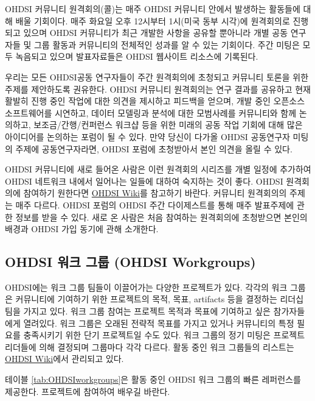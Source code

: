 \documentclass[11pt]{book}
\theoremstyle{definition}
\theoremstyle{definition}
\theoremstyle{definition}
\theoremstyle{remark}
\begin{document}
OHDSI 커뮤니티 원격회의(콜)는 매주 OHDSI 커뮤니티 안에서 발생하는
활동들에 대해 배울 기회이다. 매주 화요일 오후 12시부터 1시(미국 동부
시각)에 원격회의로 진행되고 있으며 OHDSI 커뮤니티가 최근 개발한 사항을
공유할 뿐아니라 개별 공동 연구자들 및 그룹 활동과 커뮤니티의 전체적인
성과를 알 수 있는 기회이다. 주간 미팅은 모두 녹음되고 있으며
발표자료들은 OHDSI 웹사이트 리소스에 기록된다.

우리는 모든 OHDSI공동 연구자들이 주간 원격회의에 초청되고 커뮤니티
토론을 위한 주제를 제안하도록 권유한다. OHDSI 커뮤니티 원격회의는 연구
결과를 공유하고 현재 활발히 진행 중인 작업에 대한 의견을 제시하고
피드백을 얻으며, 개발 중인 오픈소스 소프트웨어를 시연하고, 데이터
모델링과 분석에 대한 모범사례를 커뮤니티와 함께 논의하고,
보조금/간행/컨퍼런스 워크샵 등을 위한 미래의 공동 작업 기회에 대해 많은
아이디어를 논의하는 포럼이 될 수 있다. 만약 당신이 다가올 OHDSI
공동연구자 미팅의 주제에 공동연구자라면, OHDSI 포럼에 초청받아서 본인
의견을 올릴 수 있다.

OHDSI 커뮤니티에 새로 들어온 사람은 이런 원격회의 시리즈를 개별 일정에
추가하여 OHDSI 네트워크 내에서 일어나는 일들에 대하여 숙지하는 것이
좋다. OHDSI 원격회의에 참여하기 원한다면
\href{https://www.ohdsi.org/web/wiki/doku.php?id=projects:ohdsi_community}{OHDSI
Wiki}를 참고하기 바란다. 커뮤니티 원격회의의 주제는 매주 다르다. OHDSI
포럼의 OHDSI 주간 다이제스트를 통해 매주 발표주제에 관한 정보를 받을 수
있다. 새로 온 사람은 처음 참여하는 원격회의에 초청받으면 본인의 배경과
OHDSI 가입 동기에 관해 소개한다. 

\subsection{OHDSI 워크 그룹 (OHDSI
Workgroups)}\label{ohdsi---ohdsi-workgroups}

OHDSI에는 워크 그룹 팀들이 이끌어가는 다양한 프로젝트가 있다. 각각의
워크 그룹은 커뮤니티에 기여하기 위한 프로젝트의 목적, 목표, artifacts
등을 결정하는 리더십 팀을 가지고 있다. 워크 그룹 참여는 프로젝트 목적과
목표에 기여하고 싶은 참가자들에게 열려있다. 워크 그룹은 오래된 전략적
목표를 가지고 있거나 커뮤니티의 특정 필요를 충족시키기 위한 단기
프로젝트일 수도 있다. 워크 그룹의 정기 미팅은 프로젝트 리더들에 의해
결정되며 그룹마다 각각 다르다. 활동 중인 워크 그룹들의 리스트는
\href{https://www.ohdsi.org/web/wiki/doku.php?id=projects:overview}{OHDSI
Wiki}에서 관리되고 있다. 

테이블 \ref{tab:OHDSIworkgroups}은 활동 중인 OHDSI 워크 그룹의 빠른
레퍼런스를 제공한다. 프로젝트에 참여하여 배우길 바란다.
\end{document}
